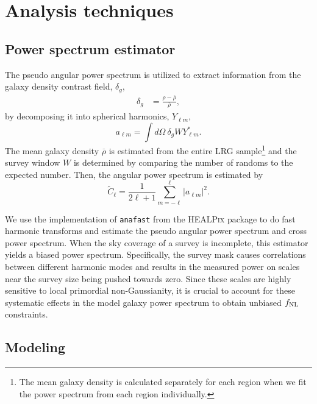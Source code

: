 \section{Analysis techniques}
\label{sec:method} 
 
\subsection{Power spectrum estimator}
The pseudo angular power spectrum \citep{hivon2002master} is utilized to extract information from the galaxy density contrast field, $\delta_{g}$, 
\begin{align}\label{eq:delta}
    \delta_{g} &= \frac{\rho- \overline{\rho}}{\overline{\rho}},
\end{align}
by decomposing it into spherical harmonics, $Y_{\ell m}$,
\begin{equation}
        a_{\ell m} = \int d\Omega ~ \delta_{g} W Y^{*}_{\ell m}.
\end{equation}
The mean galaxy density $\overline{\rho}$ is estimated from the entire LRG sample\footnote{The mean galaxy density is calculated separately for each region when we fit the power spectrum from each region individually.} and the survey window $W$ is determined by comparing the number of randoms to the expected number. Then, the angular power spectrum is estimated by
\begin{equation}\label{eq:pusedocell}
        \tilde{C}_{\ell} = \frac{1}{2\ell +1} \sum_{m=-\ell}^{\ell} |a_{\ell m}|^{2}.
\end{equation}

We use the implementation of \texttt{anafast} from the \textsc{HEALPix} package \citep{gorski2005healpix} to do fast harmonic transforms and estimate the pseudo angular power spectrum and cross power spectrum. When the sky coverage of a survey is incomplete, this estimator yields a biased power spectrum. Specifically, the survey mask causes correlations between different harmonic modes and results in the measured power on scales near the survey size being pushed towards zero. Since these scales are highly sensitive to local primordial non-Gaussianity, it is crucial to account for these systematic effects in the model galaxy power spectrum to obtain unbiased $f_{\rm NL}$ constraints.

 \subsection{Modeling}


